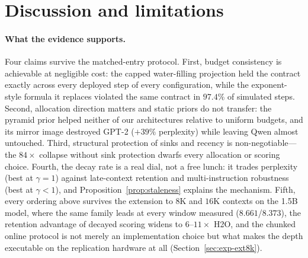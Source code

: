 \section{Discussion and limitations}\label{sec:disc}

\paragraph{What the evidence supports.}
Four claims survive the matched-entry protocol. First, budget
consistency is achievable at negligible cost: the capped water-filling
projection held the contract exactly across every deployed step of every
configuration, while the exponent-style formula it replaces violated the
same contract in $97.4\%$ of simulated steps. Second, allocation
direction matters and static priors do not transfer: the pyramid prior
helped neither of our architectures relative to uniform budgets, and its
mirror image destroyed GPT-2 ($+39\%$ perplexity) while leaving Qwen
almost untouched. Third, structural protection of sinks and recency is
non-negotiable---the $84\times$ collapse without sink protection dwarfs
every allocation or scoring choice. Fourth, the decay rate is a real
dial, not a free lunch: it trades perplexity (best at $\gamma=1$) against
late-context retention and multi-instruction robustness (best at
$\gamma<1$), and Proposition~\ref{prop:staleness} explains the mechanism.
Fifth, every ordering above survives the extension to $8$K and $16$K
contexts on the 1.5B model, where the same family leads at every window
measured ($8.661$/$8.373$), the retention advantage of decayed scoring
widens to $6$--$11\times$ H2O, and the chunked online protocol is not
merely an implementation choice but what makes the depth executable on
the replication hardware at all
(Section~\ref{sec:exp-ext8k}).

